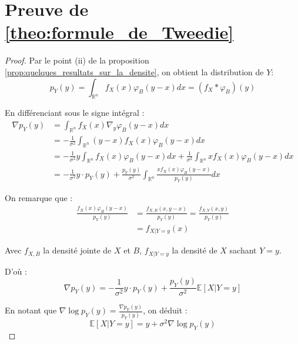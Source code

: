 \documentclass[a4paper,10pt]{article}
\theoremstyle{definition} %
\theoremstyle{definition} %
\theoremstyle{definition} %
\theoremstyle{definition} %
\begin{document}
\section{Preuve de \cref{theo:formule_de_Tweedie}}\label{sec:proof_formule_de_Tweedie}
\begin{proof}
Par le point (ii) de la proposition \cref{prop:quelques_resultats_sur_la_densite}, on obtient la distribution de $Y$:
\[ p_Y(y) = \int_{\mathbb{R}^n} f_X(x) \varphi_B(y - x) dx = (f_X * \varphi_B)(y) \]

En différenciant sous le signe intégral :
\begin{align*}
\nabla p_Y(y) &= \int_{\mathbb{R}^n} f_X(x) \nabla_y \varphi_B(y - x) dx \\
&= -\frac{1}{\sigma^2} \int_{\mathbb{R}^n} (y - x) f_X(x) \varphi_B(y - x) dx \\
&= -\frac{1}{\sigma^2} y \int_{\mathbb{R}^n} f_X(x) \varphi_B(y - x) dx + \frac{1}{\sigma^2} \int_{\mathbb{R}^n} x f_X(x) \varphi_B(y - x) dx \\
&= -\frac{1}{\sigma^2} y \cdot p_Y(y) + \frac{p_Y(y)}{\sigma^2} \int_{\mathbb{R}^n} \frac{x f_X(x) \varphi_B(y - x)}{p_Y(y)} dx
\end{align*}

On remarque que :
\begin{align*}
\frac{f_X(x) \varphi_B(y - x)}{p_Y(y)} &= \frac{f_{X,B}(x, y - x)}{p_Y(y)} = \frac{f_{X,Y}(x, y)}{p_Y(y)} \\
&= f_{X|Y=y}(x)
\end{align*}

Avec $f_{X,B}$ la densité jointe de $X$ et $B$, $f_{X|Y=y}$ la densité de $X$ sachant $Y = y$.

D'où :
\[ \nabla p_Y(y) = -\frac{1}{\sigma^2} y \cdot p_Y(y) + \frac{p_Y(y)}{\sigma^2} \mathbb{E}[X | Y = y] \]

En notant que $\nabla \log p_Y(y) = \frac{\nabla p_Y(y)}{p_Y(y)}$, on déduit :
\[ \mathbb{E}[X | Y = y] = y + \sigma^2 \nabla \log p_Y(y) \]
\end{proof}


 
\end{document}
